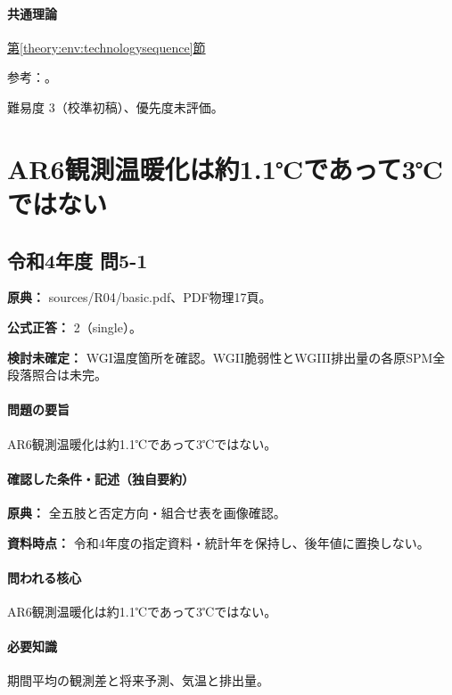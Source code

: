 \paragraph{共通理論} \hyperref[theory:env:technologysequence]{第\ref*{theory:env:technologysequence}節}

\par 参考：\cite{env59_jenner}。

\par 難易度 3（校準初稿）、優先度未評価。

\section{AR6観測温暖化は約1.1℃であって3℃ではない}

\subsection{令和4年度 問5-1}
\label{q:r04-reg-basic-5-1}

\noindent\textbf{原典：} sources/R04/basic.pdf、PDF物理17頁。

\textbf{公式正答：} 2（single）。

\par\textbf{検討未確定：} WGI温度箇所を確認。WGII脆弱性とWGIII排出量の各原SPM全段落照合は未完。

\paragraph{問題の要旨} AR6観測温暖化は約1.1℃であって3℃ではない。

\paragraph{確認した条件・記述（独自要約）}\mbox{}\par

\noindent\textbf{原典：} 全五肢と否定方向・組合せ表を画像確認。\par

\noindent\textbf{資料時点：} 令和4年度の指定資料・統計年を保持し、後年値に置換しない。\par

\paragraph{問われる核心} AR6観測温暖化は約1.1℃であって3℃ではない。

\paragraph{必要知識} 期間平均の観測差と将来予測、気温と排出量。

